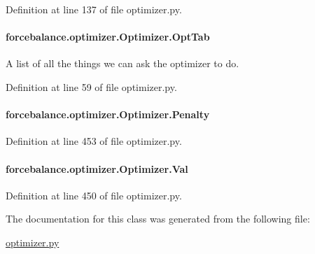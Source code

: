 Definition at line 137 of file optimizer.\-py.

\hypertarget{classforcebalance_1_1optimizer_1_1Optimizer_a30e7e28bf0af3cffc94aa51a58a3d345}{
\paragraph[{Opt\-Tab}]{\setlength{\rightskip}{0pt plus 5cm}forcebalance.\-optimizer.\-Optimizer.\-Opt\-Tab}}\label{classforcebalance_1_1optimizer_1_1Optimizer_a30e7e28bf0af3cffc94aa51a58a3d345}


A list of all the things we can ask the optimizer to do. 



Definition at line 59 of file optimizer.\-py.

\hypertarget{classforcebalance_1_1optimizer_1_1Optimizer_a5dc01aec7e22062a42cc83298c49cadd}{
\paragraph[{Penalty}]{\setlength{\rightskip}{0pt plus 5cm}forcebalance.\-optimizer.\-Optimizer.\-Penalty}}\label{classforcebalance_1_1optimizer_1_1Optimizer_a5dc01aec7e22062a42cc83298c49cadd}


Definition at line 453 of file optimizer.\-py.

\hypertarget{classforcebalance_1_1optimizer_1_1Optimizer_a2577b97a9ee5f3fcd4aa108a2baafc04}{
\paragraph[{Val}]{\setlength{\rightskip}{0pt plus 5cm}forcebalance.\-optimizer.\-Optimizer.\-Val}}\label{classforcebalance_1_1optimizer_1_1Optimizer_a2577b97a9ee5f3fcd4aa108a2baafc04}


Definition at line 450 of file optimizer.\-py.



The documentation for this class was generated from the following file\-:\begin{DoxyCompactItemize}
\item 
\hyperlink{optimizer_8py}{optimizer.\-py}\end{DoxyCompactItemize}
